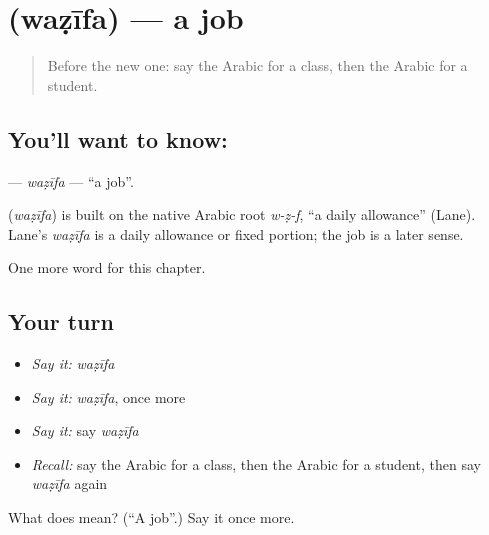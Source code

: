 \section[\texorpdfstring{\ar{وظيفة} (waẓīfa)}{وظيفة (waẓīfa)}]{ (waẓīfa) — a job}

\label{lesson:AR-C143-wazifa}



\begin{quote}
Before the new one: say the Arabic for a class, then the Arabic for a student.
\end{quote}

\subsection*{You'll want to know: }
\textbf{} — \emph{waẓīfa} — \textquotedblleft{}a job\textquotedblright{}.

\begin{cousinweb}
\textbf{} (\emph{waẓīfa}) is built on the native Arabic root \emph{w-ẓ-f}, \textquotedblleft{}a daily allowance\textquotedblright{} (Lane). Lane's \emph{waẓīfa} is a daily allowance or fixed portion; the job is a later sense.
\end{cousinweb}

\begin{grammarlens}[title={What you've built}]
One more word for this chapter.
\end{grammarlens}

\subsection*{Your turn}
\begin{itemize}
\raggedright
  \item \emph{Say it:} \emph{waẓīfa}
  \item \emph{Say it:} \emph{waẓīfa}, once more
  \item \emph{Say it:} say \emph{waẓīfa}
  \item \emph{Recall:} say the Arabic for a class, then the Arabic for a student, then say \emph{waẓīfa} again
\end{itemize}

\begin{tcolorbox}[breakable,colback=teal!4,colframe=teal!35!black,title={Before you move on}]
What does  mean? (\textquotedblleft{}A job\textquotedblright{}.) Say it once more.
\end{tcolorbox}
